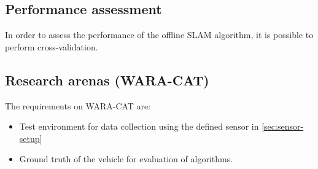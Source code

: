 \subsection{Performance assessment}

In order to assess the performance of the offline \gls{SLAM}
algorithm, it is possible to perform cross-validation.

\subsection{Research arenas (WARA-CAT)}


The requirements on WARA-CAT are:
\begin{itemize}
  \item Test environment for data collection using the defined sensor in
    \ref{sec:sensor-setup}
\item Ground truth of the vehicle for evaluation of algorithms.
\end{itemize}


